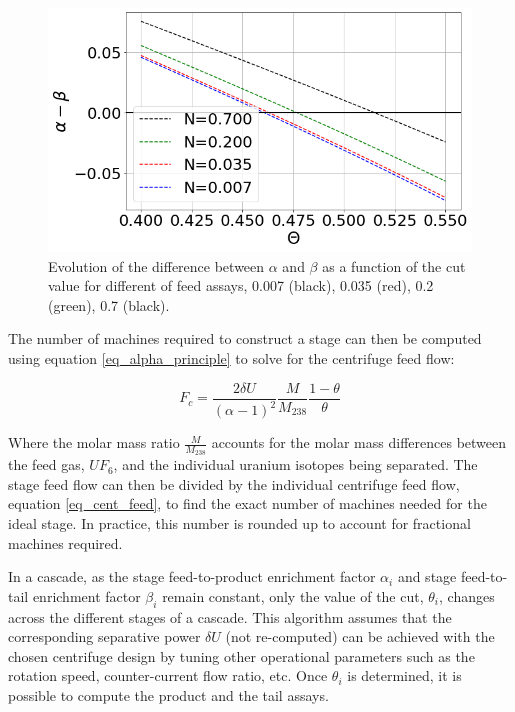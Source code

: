 \begin{figure}[h!] %
    \centering
    \includegraphics[scale=0.5]{alpha_minus_beta}
    \caption{Evolution of the difference between $\alpha$ and $\beta$ as a
    function of the cut value for different of feed assays, 0.007 (black),
    0.035 (red), 0.2 (green), 0.7 (black). }
    \label{fig_a_m_b}
\end{figure}

The number of machines required to construct a stage can then be computed using
equation \eqref{eq_alpha_principle} to solve for the centrifuge feed flow:

\begin{equation}\label{eq_cent_feed}
    F_c = \frac{2 \delta U}{(\alpha - 1)^2} \frac{M}{M_{238}} \frac{1-\theta}{\theta}
\end{equation}

Where the molar mass ratio $\frac{M}{M_{238}}$ accounts for the molar mass
differences between the feed gas, $UF_6$, and the individual uranium isotopes
being separated. The stage feed flow can then be divided by the individual
centrifuge feed flow, equation \eqref{eq_cent_feed}, to find the exact number of
machines needed for the ideal stage. In practice, this number is rounded up to
account for fractional machines required.


In a cascade, as the stage feed-to-product enrichment factor $\alpha_{i}$ and stage feed-to-tail enrichment factor $\beta_{i}$ remain constant, only the value of
the cut, $\theta_{i}$, changes across the different stages of a cascade.  This
algorithm assumes that the corresponding separative power $\delta U$ (not
re-computed) can be achieved with the chosen centrifuge design by tuning other
operational parameters such as the rotation speed, counter-current flow
ratio, etc.  Once $\theta_{i}$ is determined, it is possible to compute the
product and the tail assays.


